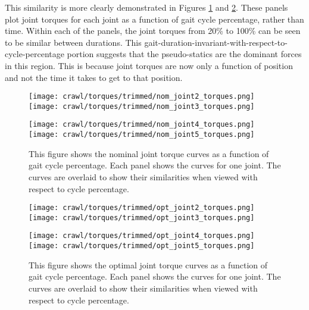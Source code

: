 This similarity is more clearly demonstrated in Figures \ref{fig:vrep_nom_joint_torques_by_joint_over_cycle1}
and \ref{fig:vrep_opt_joint_torques_by_joint_over_cycle1}. These panels plot joint torques
for each joint as a function of gait cycle percentage, rather than time. Within each of the
panels, the joint torques from 20\% to 100\% can be seen to be similar between durations. 
This gait-duration-invariant-with-respect-to-cycle-percentage portion suggests that
the pseudo-statics are the dominant forces in this region. This is because joint torques
are now only a function of position and not the time it takes to get to that position.

\begin{figure}
  \centerline{
    \texttt{[image: crawl/torques/trimmed/nom\_joint2\_torques.png]}
    \texttt{[image: crawl/torques/trimmed/nom\_joint3\_torques.png]}
  }
  \centerline{
    \texttt{[image: crawl/torques/trimmed/nom\_joint4\_torques.png]}
    \texttt{[image: crawl/torques/trimmed/nom\_joint5\_torques.png]}
  }
  \caption{This figure shows the nominal joint torque curves as a function of gait cycle percentage.
           Each panel shows the curves for one joint. The curves are overlaid to show their
           similarities when viewed with respect to cycle percentage.}
  \label{fig:vrep_nom_joint_torques_by_joint_over_cycle1}
\end{figure}

\begin{figure}
  \centerline{
    \texttt{[image: crawl/torques/trimmed/opt\_joint2\_torques.png]}
    \texttt{[image: crawl/torques/trimmed/opt\_joint3\_torques.png]}
  }
  \centerline{
    \texttt{[image: crawl/torques/trimmed/opt\_joint4\_torques.png]}
    \texttt{[image: crawl/torques/trimmed/opt\_joint5\_torques.png]}
  }
  \caption{This figure shows the optimal joint torque curves as a function of gait cycle percentage.
           Each panel shows the curves for one joint. The curves are overlaid to show their
           similarities when viewed with respect to cycle percentage.}
  \label{fig:vrep_opt_joint_torques_by_joint_over_cycle1}
\end{figure}

